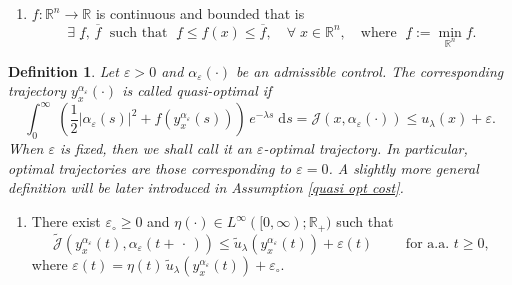 \documentclass[10pt,a4paper]{amsart}
\newtheorem{definition}{Definition}
\begin{document}
\begin{enumerate}[label=\textbf{(A\arabic*)}]
\item\label{f: nice} $f : \mathbb{R}^n\to\mathbb{R}$ is  continuous and bounded that is
    \begin{equation*}
    \exists\;\underline{f},\,\overline{f}\; \text{ such that }\; \underline{f} \leq f(x) \leq \overline{f},\quad \forall\;x\in \mathbb{R}^n, \quad \text{where } \; \underline{f}:= \min\limits_{\mathbb{R}^{n}}f.
    \end{equation*}
\end{enumerate}

\begin{definition}\label{def: quasi}
Let $\varepsilon>0$ %
and $\alpha_{\varepsilon}(\cdot)$ be an admissible control. The corresponding trajectory $y_{x}^{\alpha_{\varepsilon}}(\cdot)$ is called quasi-optimal if 
\begin{equation*}
     \int_{0}^{\infty}\; \left(\frac{1}{2}|\alpha_{\varepsilon}(s)|^{2} + f(y_{x}^{\alpha_{\varepsilon}}(s))\right)\, e^{-\lambda s}\;\text{d}s = \mathscr{J}(x,\alpha_{\varepsilon}(\cdot)) \leq u_{\lambda}(x)+ \varepsilon.
\end{equation*}
When $\varepsilon$ is fixed, then we shall call it an $\varepsilon$-optimal trajectory. In particular, 
optimal trajectories are those corresponding to $\varepsilon=0$. A slightly more general definition will be later introduced in Assumption \ref{quasi opt cost}.
\end{definition}

\begin{enumerate}[label=\textbf{(C)}]
    \item\label{quasi opt cost} There exist $\varepsilon_{\circ}\geq 0$ and $\eta(\cdot)\in L^{\infty}([0,\infty);\mathbb{R}_{+})$ 
    such that
    \begin{equation*}
       \widetilde{\mathscr{J}}(y_{x}^{\alpha_{\varepsilon}}(t),\alpha_{\varepsilon}(t+\,\cdot\,)) \leq \tilde{u}_{\lambda}(y_{x}^{\alpha_{\varepsilon}}(t)) + \varepsilon(t) \quad \quad \text{ for a.a. } t\geq 0,
    \end{equation*} 
    where $\varepsilon(t) = \eta(t)\,\tilde{u}_{\lambda}(y_{x}^{\alpha_{\varepsilon}}(t)) + \varepsilon_{\circ}$.
\end{enumerate}
\end{document}
